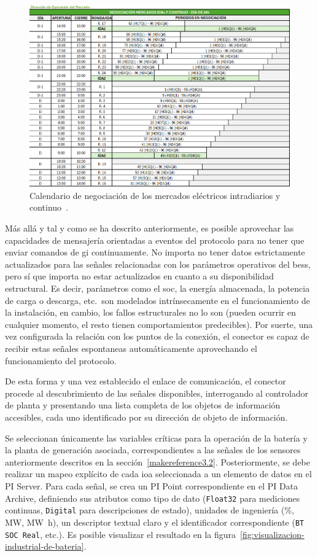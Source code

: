 \begin{figure}
  \centering
  \includegraphics[width=0.75\linewidth]{figures/tiempo-mercados.png}
  \caption[Calendario de negociación de los mercados eléctricos.]{Calendario de negociación de los mercados eléctricos intradiarios y continuo~\cite{omie2025mercado}.}%
  \label{fig:tiempo-mercados}
\end{figure}

Más allá y tal y como se ha descrito anteriormente, es posible aprovechar las capacidades de mensajería orientadas a eventos del protocolo para no tener que enviar comandos de \gls{gi} continuamente. No importa no tener datos estrictamente actualizados para las señales relacionadas con los parámetros operativos del \gls{bess}, pero sí que importa no estar actualizados en cuanto a su disponibilidad estructural. Es decir, parámetros como el \gls{soc}, la energía almacenada, la potencia de carga o descarga, etc.\ son modelados intrínsecamente en el funcionamiento de la instalación, en cambio, los fallos estructurales no lo son (pueden ocurrir en cualquier momento, el resto tienen comportamientos predecibles). Por suerte, una vez configurada la relación con los puntos de la conexión, el conector es capaz de recibir estas señales espontaneas automáticamente aprovechando el funcionamiento del protocolo.

De esta forma y una vez establecido el enlace de comunicación, el conector procede al descubrimiento de las señales disponibles, interrogando al controlador de planta y presentando una lista completa de los objetos de información accesibles, cada uno identificado por su dirección de objeto de información.

Se seleccionan únicamente las variables críticas para la operación de la batería y la planta de generación asociada, correspondientes a las señales de los sensores anteriormente descritos en la sección~\ref{makereference3.2}. Posteriormente, se debe realizar un mapeo explícito de cada \gls{ioa} seleccionada a un elemento de datos en el PI Server. Para cada señal, se crea un PI Point correspondiente en el PI Data Archive, definiendo sus atributos como tipo de dato (\texttt{Float32} para mediciones continuas, \texttt{Digital} para descripciones de estado), unidades de ingeniería (\si{\percent}, \si{\mega\watt}, \si{\mega\watt\hour}), un descriptor textual claro y el identificador correspondiente (\texttt{BT SOC Real}, etc.). Es posible visualizar el resultado en la figura~\ref{fig:visualizacion-industrial-de-bateria}.

